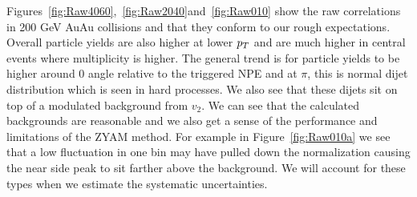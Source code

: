Figures~\ref{fig:Raw4060},~\ref{fig:Raw2040}and~\ref{fig:Raw010} show the raw correlations in 200 GeV AuAu collisions and that they conform to our rough expectations. Overall particle yields are also higher at lower $p_{T}$ and are much higher in central events where multiplicity is higher. The general trend is for particle yields to be higher around 0 angle relative to the triggered NPE and at $\pi$, this is normal dijet distribution which is seen in hard processes. We also see that these dijets sit on top of a modulated background from $v_2$. We can see that the calculated backgrounds are reasonable and we also get a sense of the performance and limitations of the ZYAM method. For example in Figure~\ref{fig:Raw010a} we see that a low fluctuation in one bin may have pulled down the normalization causing the near side peak to sit farther above the background. We will account for these types when we estimate the systematic uncertainties.

